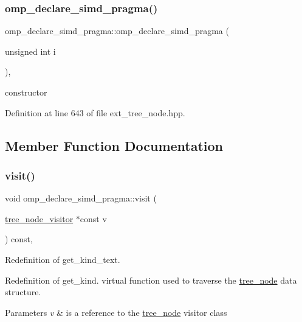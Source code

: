 \subsubsection{\texorpdfstring{omp\+\_\+declare\+\_\+simd\+\_\+pragma()}{omp\_declare\_simd\_pragma()}}
{\footnotesize\ttfamily omp\+\_\+declare\+\_\+simd\+\_\+pragma\+::omp\+\_\+declare\+\_\+simd\+\_\+pragma (\begin{DoxyParamCaption}\item[{unsigned int}]{i }\end{DoxyParamCaption})\hspace{0.3cm}{\ttfamily [inline]}, {\ttfamily [explicit]}}



constructor 



Definition at line 643 of file ext\+\_\+tree\+\_\+node.\+hpp.



\subsection{Member Function Documentation}
\mbox{\label{structomp__declare__simd__pragma_a3745037752b1b165a418e50058eed19a}} 
\subsubsection{\texorpdfstring{visit()}{visit()}}
{\footnotesize\ttfamily void omp\+\_\+declare\+\_\+simd\+\_\+pragma\+::visit (\begin{DoxyParamCaption}\item[{\hyperlink{classtree__node__visitor}{tree\+\_\+node\+\_\+visitor} $\ast$const}]{v }\end{DoxyParamCaption}) const\hspace{0.3cm}{\ttfamily [override]}, {\ttfamily [virtual]}}



Redefinition of get\+\_\+kind\+\_\+text. 

Redefinition of get\+\_\+kind. virtual function used to traverse the \hyperlink{classtree__node}{tree\+\_\+node} data structure. 
\begin{DoxyParams}{Parameters}
{\em v} & is a reference to the \hyperlink{classtree__node}{tree\+\_\+node} visitor class \\
\hline
\end{DoxyParams}


